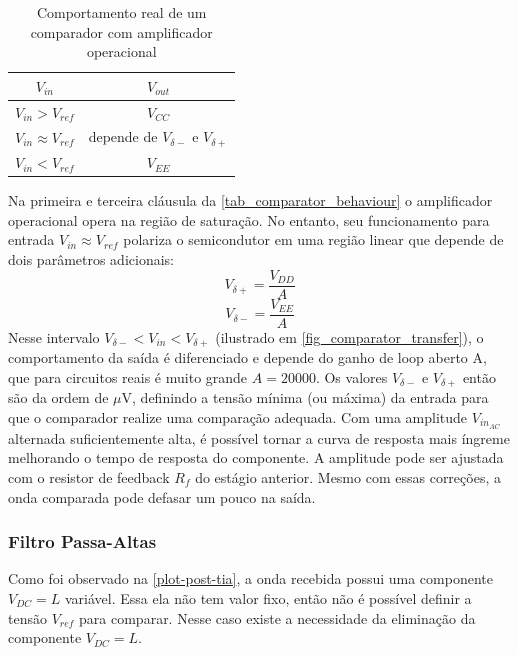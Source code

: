 	\begin{table}[ht]
		\caption{Comportamento real de um comparador com amplificador operacional}\label{tab_comparator_behaviour}
		\centering
		\begin{tabular}{c c}
			\hline
			$V_{in}$ & $V_{out}$\\ \hline
			$V_{in} > V_{ref}$& $V_{CC}$\\
			$V_{in} \approx V_{ref}$& depende de $V_{\delta-}$ e $V_{\delta+}$\\
			$V_{in} < V_{ref}$& $V_{EE}$\\
			\hline
		\end{tabular}
	\end{table}
	
	Na primeira e terceira cláusula da \autoref{tab_comparator_behaviour} o amplificador operacional opera na região de saturação. No entanto, seu funcionamento para entrada $V_{in} \approx V_{ref}$ polariza o semicondutor em uma região linear que depende de dois parâmetros adicionais:
	\begin{equation}
	V_{\delta+} = \frac{V_{DD}}{A}
	\end{equation}
	\begin{equation}
	V_{\delta-} = \frac{V_{EE}}{A}
	\end{equation}
	Nesse intervalo $V_{\delta-} < V_{in} < V_{\delta+}$ (ilustrado em \autoref{fig_comparator_transfer}), o comportamento da saída é diferenciado e depende do ganho de loop aberto A, que para circuitos reais é muito grande $A=20000$. Os valores $V_{\delta-}$ e $V_{\delta+}$ então são da ordem de  $\mu$V, definindo a tensão mínima (ou máxima) da entrada para que o comparador realize uma comparação adequada. Com uma amplitude $V_{in_{AC}}$ alternada suficientemente alta, é possível tornar a curva de resposta mais íngreme melhorando o tempo de resposta do componente. A amplitude pode ser ajustada com o resistor de feedback $R_{f}$ do estágio anterior. Mesmo com essas correções, a onda comparada pode defasar um pouco na saída.
	
	\subsubsection{Filtro Passa-Altas}\label{method-hardware-highpass-filter}
	
	Como foi observado na \autoref{plot-post-tia}, a onda recebida possui uma componente $V_{DC} = L$ variável. Essa ela não tem valor fixo, então não é possível definir a tensão $V_{ref}$ para comparar. Nesse caso existe a necessidade da eliminação da componente $V_{DC} = L$.
	
